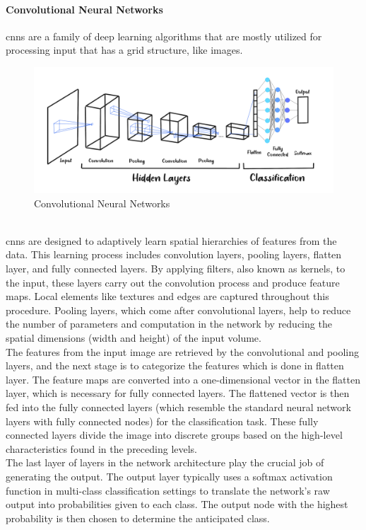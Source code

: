 \paragraph{Convolutional Neural Networks}
\nocite{ibm_2023_what_cnn}
\nocite{mishra_2020_convolutional}
\nocite{mandal_2021_cnn}
\nocite{saha_2018_a}
\gls{cnns} are a family of deep learning algorithms that are mostly utilized for processing input that has a grid structure, like images. \cite{yamashita_2018_convolutional}
\\
\begin{figure}[!ht]
    \centering
    \includegraphics[width=16cm]{Images/cnns.png}
    \caption{Convolutional Neural Networks}
    \label{fig:cnns}
\end{figure}
\\
\indent \gls{cnns} are designed to adaptively learn spatial hierarchies of features from the data. 
This learning process includes convolution layers, pooling layers, flatten layer, and fully connected layers.
By applying filters, also known as kernels, to the input, these layers carry out the convolution process and produce feature maps. 
Local elements like textures and edges are captured throughout this procedure.
Pooling layers, which come after convolutional layers, help to reduce the number of parameters and computation in the network by reducing the spatial dimensions (width and height) of the input volume. 
\\
\indent The features from the input image are retrieved by the convolutional and pooling layers, and the next stage is to categorize the features which is done in flatten layer.
The feature maps are converted into a one-dimensional vector in the flatten layer, which is necessary for fully connected layers.
The flattened vector is then fed into the fully connected layers (which resemble the standard neural network layers with fully connected nodes) for the classification task. 
These fully connected layers divide the image into discrete groups based on the high-level characteristics found in the preceding levels.
\\
\indent The last layer of layers in the network architecture play the crucial job of generating the output.
The output layer typically uses a softmax activation function in multi-class classification settings to translate the network's raw output into probabilities given to each class. 
The output node with the highest probability is then chosen to determine the anticipated class.
\\
